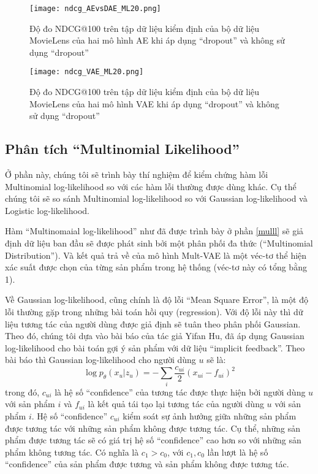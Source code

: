     \begin{figure}
        \centering
        \texttt{[image: ndcg\_AEvsDAE\_ML20.png]}
        \caption[Độ đo NDCG trên tập kiểm tra của mô hình AE trên tập dữ liệu MovieLens]{Độ đo NDCG@100 trên tập dữ liệu kiểm định của bộ dữ liệu MovieLens của hai mô hình AE khi áp dụng ``dropout'' và không sử dụng ``dropout''}
        \label{ndcg_AE_ML20}
    \end{figure}

    \begin{figure}
        \centering
        \texttt{[image: ndcg\_VAE\_ML20.png]}
        \caption[Độ đo NDCG trên tập kiểm tra của mô hình VAE trên tập dữ liệu MovieLens]{Độ đo NDCG@100 trên tập dữ liệu kiểm định của bộ dữ liệu MovieLens của hai mô hình VAE khi áp dụng ``dropout'' và không sử dụng ``dropout''}
        \label{ndcg_VAE_ML20}
    \end{figure}


    \subsection{Phân tích ``Multinomial Likelihood''}

    Ở phần này, chúng tôi sẽ trình bày thí nghiệm để kiểm chứng hàm lỗi Multinomial log-likelihood so với các hàm lỗi thường được dùng khác.
    Cụ thể chúng tôi sẽ so sánh Multinomial log-likelihood so với Gaussian log-likelihood và Logistic log-likelihood. 


    Hàm ``Multinomaial log-likelihood'' như đã được trình bày ở phần \ref{mulll} sẽ giả định dữ liệu ban đầu sẽ được phát sinh bởi một phân phối đa thức (``Multinomial Distribution'').
    Và kết quả trả về của mô hình Mult-VAE là một véc-tơ thể hiện xác suất được chọn của từng sản phẩm trong hệ thống (véc-tơ này có tổng bằng 1).
    
    Về Gaussian log-likelihood, cũng chính là độ lỗi ``Mean Square Error'', là một độ lỗi thường gặp trong những bài toán hồi quy (regression). 
    Với độ lỗi này thì dữ liệu tương tác của người dùng được giả định sẽ tuân theo phân phối Gaussian. 
    Theo đó, chúng tôi dựa vào bài báo \cite{yifan_cf} của tác giả Yifan Hu, đã áp dụng Gaussian log-likelihood cho bài toán gợi ý sản phẩm với dữ liệu ``implicit feedback''. 
    Theo bài báo thì Gaussian log-likelihood cho người dùng $u$ sẽ là:
    \begin{equation}
        \log p_\theta(x_u|z_u) = -\sum_i \frac{c_{ui}}{2}(x_{ui} - f_{ui})^2
    \end{equation}
    trong đó, $c_{ui}$ là hệ số ``confidence'' của tương tác được thực hiện bởi người dùng $u$ với sản phẩm $i$ và $f_{ui}$ là kết quả tái tạo lại tương tác của người dùng $u$ với sản phẩm $i$.
    Hệ số ``confidence'' $c_{ui}$ kiểm soát sự ảnh hưởng giữa những sản phẩm được tương tác với những sản phẩm không được tương tác.
    Cụ thể, những sản phẩm được tương tác sẽ có giá trị hệ số ``confidence'' cao hơn so với những sản phẩm không tương tác.
    Có nghĩa là $c_{1}  > c_0$, với $c_1,c_0$ lần lượt là hệ số ``confidence'' của sản phẩm được tương và sản phẩm không được tương tác. 
    
